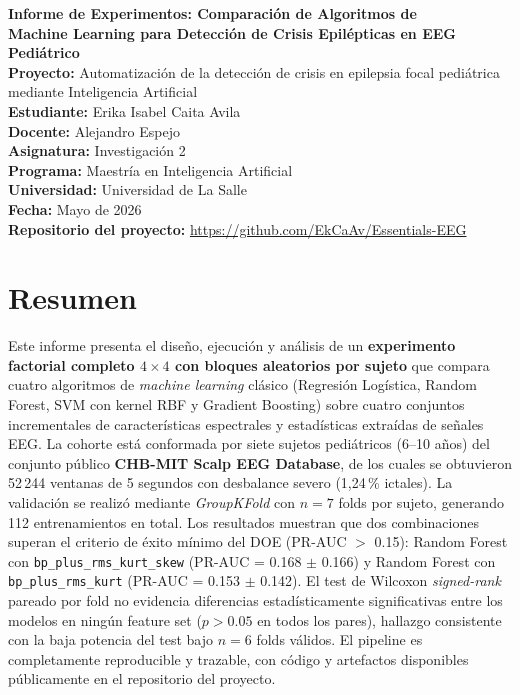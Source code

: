 \documentclass[12pt,a4paper]{article}
\begin{document}
\begin{center}
{\Large \textbf{Informe de Experimentos: Comparación de Algoritmos de\\
Machine Learning para Detección de Crisis Epilépticas en EEG Pediátrico}}\\[0.6cm]

\textbf{Proyecto:} Automatización de la detección de crisis en epilepsia focal pediátrica
mediante Inteligencia Artificial\\[0.3cm]

\textbf{Estudiante:} Erika Isabel Caita Avila\\
\textbf{Docente:} Alejandro Espejo\\
\textbf{Asignatura:} Investigación 2\\
\textbf{Programa:} Maestría en Inteligencia Artificial\\
\textbf{Universidad:} Universidad de La Salle\\
\textbf{Fecha:} Mayo de 2026\\[0.3cm]

\textbf{Repositorio del proyecto:}
\url{https://github.com/EkCaAv/Essentials-EEG}
\end{center}

\vspace{0.4cm}

\section*{Resumen}

Este informe presenta el diseño, ejecución y análisis de un \textbf{experimento factorial
completo $4 \times 4$ con bloques aleatorios por sujeto} que compara cuatro algoritmos de
\textit{machine learning} clásico (Regresión Logística, Random Forest, SVM con kernel RBF
y Gradient Boosting) sobre cuatro conjuntos incrementales de características espectrales
y estadísticas extraídas de señales EEG. La cohorte está conformada por siete sujetos
pediátricos (6--10 años) del conjunto público \textbf{CHB-MIT Scalp EEG Database},
de los cuales se obtuvieron 52\,244 ventanas de 5 segundos con desbalance severo
(1,24\,\% ictales). La validación se realizó mediante \textit{GroupKFold} con $n=7$ folds
por sujeto, generando 112 entrenamientos en total. Los resultados muestran que dos
combinaciones superan el criterio de éxito mínimo del DOE (PR-AUC $>$ 0.15): Random
Forest con \texttt{bp\_plus\_rms\_kurt\_skew} (PR-AUC = 0.168 $\pm$ 0.166) y Random Forest
con \texttt{bp\_plus\_rms\_kurt} (PR-AUC = 0.153 $\pm$ 0.142). El test de Wilcoxon
\textit{signed-rank} pareado por fold no evidencia diferencias estadísticamente
significativas entre los modelos en ningún feature set ($p > 0.05$ en todos los pares),
hallazgo consistente con la baja potencia del test bajo $n=6$ folds válidos. El pipeline
es completamente reproducible y trazable, con código y artefactos disponibles públicamente
en el repositorio del proyecto.
\end{document}
